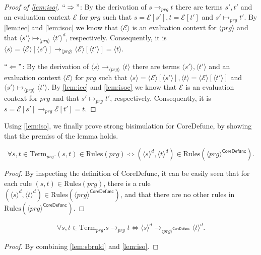 \begin{proof}[Proof of \autoref{lem:iso}]
$``\Rightarrow"$: By the derivation of $s \longrightarrow_{prg} t$ there are terms $s', t'$ and an evaluation context $\mathcal{E}$ for $prg$ such that $s = \mathcal{E}[s'], t = \mathcal{E}[t']$ and $s' \mapsto_{prg} t'$. By \autoref{lem:iec} and \autoref{lem:isoc} we know that $\langle \mathcal{E} \rangle$ is an evaluation context for $\langle prg \rangle$ and that $\langle s' \rangle \mapsto_{\langle prg \rangle} \langle t' \rangle^d$, respectively. Consequently, it is $\langle s \rangle = \langle \mathcal{E} \rangle [\langle s' \rangle] \longrightarrow_{\langle prg \rangle} \langle \mathcal{E} \rangle [\langle t' \rangle] = \langle t \rangle$.

$``\Leftarrow"$: By the derivation of $\langle s \rangle \longrightarrow_{\langle prg \rangle} \langle t \rangle$ there are terms $\langle s' \rangle, \langle t' \rangle$ and an evaluation context $\langle \mathcal{E} \rangle$ for $prg$ such that $\langle s \rangle = \langle \mathcal{E} \rangle[\langle s' \rangle], \langle t \rangle = \langle \mathcal{E} \rangle [\langle t' \rangle]$ and $\langle s' \rangle \mapsto_{\langle prg \rangle} \langle t' \rangle$. By \autoref{lem:iec} and \autoref{lem:isoc} we know that $\mathcal{E}$ is an evaluation context for $prg$ and that $s' \mapsto_{prg} t'$, respectively. Consequently, it is $s = \mathcal{E}[s'] \longrightarrow_{prg} \mathcal{E}[t'] = t$.
\end{proof}

Using \autoref{lem:iso}, we finally prove strong bisimulation for \textsf{CoreDefunc}, by showing that the premiss of the lemma holds.

\begin{lemma}
\label{lem:sbruld}
\[
\forall s,t \in \textrm{Term}_{prg}. (s, t) \in \textrm{Rules}(prg) \iff (\langle s \rangle^d, \langle t \rangle^d) \in \textrm{Rules}(\langle prg \rangle^{\textsf{CoreDefunc}}).
\]
\begin{proof}
By inspecting the definition of \textsf{CoreDefunc}, it can be easily seen that for each rule $(s, t) \in \textrm{Rules}(prg)$, there is a rule $(\langle s \rangle^d, \langle t \rangle^d) \in \textrm{Rules}(\langle prg \rangle^{\textsf{CoreDefunc}})$, and that there are no other rules in $\textrm{Rules}(\langle prg \rangle^{\textsf{CoreDefunc}})$.
\end{proof}
\end{lemma}

\begin{corollary}
\[
\forall s,t \in \textrm{Term}_{prg}. s \longrightarrow_{prg} t \iff \langle s \rangle^d \longrightarrow_{\langle prg \rangle^{\textsf{CoreDefunc}}} \langle t \rangle^d.
\]
\begin{proof}
By combining \autoref{lem:sbruld} and \autoref{lem:iso}.
\end{proof}
\end{corollary}

